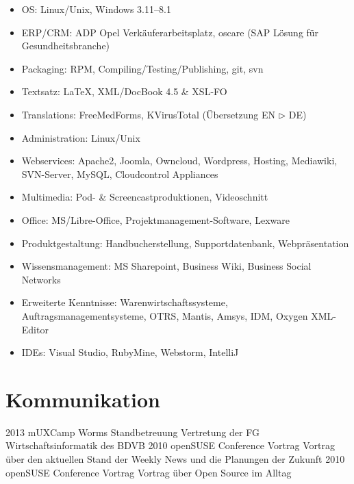 \documentclass[a4paper,latin]{friggeri-cv} %
\begin{document}
\begin{itemize}
\item OS: Linux/Unix, Windows 3.11--8.1
\item ERP/CRM: ADP Opel Verkäuferarbeitsplatz, oscare (SAP Lösung für Gesundheitsbranche)
\item Packaging: RPM, Compiling/Testing/Publishing, git, svn
\item Textsatz: \LaTeX, XML/DocBook 4.5 \& XSL-FO
\item Translations: FreeMedForms, KVirusTotal (Übersetzung EN $\triangleright$ DE)
\item Administration: Linux/Unix
\item Webservices: Apache2, Joomla, Owncloud, Wordpress, Hosting, Mediawiki, SVN-Server, MySQL, Cloudcontrol Appliances
\item Multimedia: Pod- \& Screencastproduktionen, Videoschnitt
\item Office: MS/Libre-Office, Projektmanagement-Software, Lexware
\item Produktgestaltung: Handbucherstellung, Supportdatenbank, Webpräsentation
\item Wissensmanagement: MS Sharepoint, Business Wiki, Business Social Networks
\item Erweiterte Kenntnisse: Warenwirtschaftssysteme, Auftragsmanagementsysteme, OTRS, Mantis, Amsys, IDM, Oxygen XML-Editor
\item IDEs: Visual Studio, RubyMine, Webstorm, IntelliJ
\end{itemize}


\section{Kommunikation}

\begin{entrylist}
\entry
{2013}
{mUXCamp Worms}
{Standbetreuung}
{Vertretung der FG Wirtschaftsinformatik des BDVB}
\entry
{2010}
{openSUSE Conference}
{Vortrag}
{Vortrag über den aktuellen Stand der Weekly News und die Planungen der Zukunft}
\entry
{2010}
{openSUSE Conference}
{Vortrag}
{Vortrag über Open Source im Alltag}
\end{entrylist}
\end{document}
